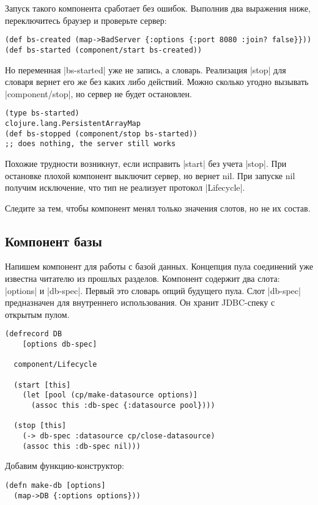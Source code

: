 Запуск такого компонента сработает без ошибок. Выполнив два выражения ниже,
переключитесь браузер и проверьте сервер:

\begin{verbatim}
(def bs-created (map->BadServer {:options {:port 8080 :join? false}}))
(def bs-started (component/start bs-created))
\end{verbatim}

Но переменная \spverb|bs-started| уже не запись, а словарь. Реализация \spverb|stop| для
словаря вернет его же без каких либо действий. Можно сколько угодно вызывать
\spverb|component/stop|, но сервер не будет остановлен.

\begin{verbatim}
(type bs-started)
clojure.lang.PersistentArrayMap
(def bs-stopped (component/stop bs-started))
;; does nothing, the server still works
\end{verbatim}

Похожие трудности возникнут, если исправить \spverb|start| без учета \spverb|stop|. При
остановке плохой компонент выключит сервер, но вернет nil. При запуске nil
получим исключение, что тип не реализует протокол \spverb|Lifecycle|.

Следите за тем, чтобы компонент менял только значения слотов, но не их состав.

\subsection{Компонент базы}

Напишем компонент для работы с базой данных. Концепция пула соединений уже
известна читателю из прошлых разделов. Компонент содержит два слота: \spverb|options| и
\spverb|db-spec|. Первый это словарь опций будущего пула. Слот \spverb|db-spec| предназначен
для внутреннего использования. Он хранит JDBC-спеку с открытым пулом.

\begin{verbatim}
(defrecord DB
    [options db-spec]

  component/Lifecycle

  (start [this]
    (let [pool (cp/make-datasource options)]
      (assoc this :db-spec {:datasource pool})))

  (stop [this]
    (-> db-spec :datasource cp/close-datasource)
    (assoc this :db-spec nil)))
\end{verbatim}

Добавим функцию-конструктор:

\begin{verbatim}
(defn make-db [options]
  (map->DB {:options options}))
\end{verbatim}

